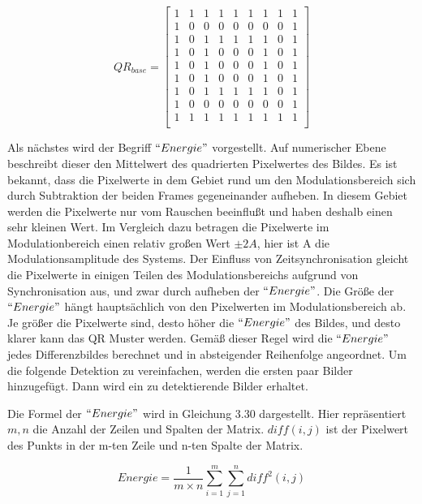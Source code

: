 \begin{equation}
QR_{base} = \begin{bmatrix}
    1 &1 &1 &1 &1 &1 &1 &1 &1 \\
    1 &0 &0 &0 &0 &0 &0 &0 &1 \\
    1 &0 &1 &1 &1 &1 &1 &0 &1 \\ 
    1 &0 &1 &0 &0 &0 &1 &0 &1 \\ 
    1 &0 &1 &0 &0 &0 &1 &0 &1 \\ 
    1 &0 &1 &0 &0 &0 &1 &0 &1 \\ 
    1 &0 &1 &1 &1 &1 &1 &0 &1 \\ 
    1 &0 &0 &0 &0 &0 &0 &0 &1 \\ 
    1 &1 &1 &1 &1 &1 &1 &1 &1 \\ 
\end{bmatrix}
\end{equation}

Als nächstes wird der Begriff $``Energie"$ vorgestellt. Auf numerischer Ebene beschreibt dieser den Mittelwert des quadrierten Pixelwertes des Bildes. Es ist bekannt, dass die Pixelwerte in dem Gebiet rund um den Modulationsbereich sich durch Subtraktion der beiden Frames gegeneinander aufheben. In diesem Gebiet werden die Pixelwerte nur vom Rauschen beeinflußt und haben deshalb einen sehr kleinen Wert. Im Vergleich dazu betragen die Pixelwerte im Modulationbereich einen relativ großen Wert $\pm2A$, hier ist A die Modulationsamplitude des Systems. Der Einfluss von Zeitsynchronisation gleicht die Pixelwerte in einigen Teilen des Modulationsbereichs aufgrund von Synchronisation aus, und zwar durch aufheben der $ ``Energie" $. Die Größe der $``Energie"$ hängt hauptsächlich von den Pixelwerten im Modulationsbereich ab. Je größer die Pixelwerte sind, desto höher die $``Energie"$ des Bildes, und desto klarer kann das QR Muster werden. Gemäß dieser Regel wird die $``Energie"$ jedes Differenzbildes berechnet und in absteigender Reihenfolge angeordnet. Um die folgende Detektion zu vereinfachen, werden die ersten paar Bilder hinzugefügt. Dann wird ein zu detektierende Bilder erhaltet. %

Die Formel der $``Energie"$ wird in Gleichung 3.30 dargestellt. Hier repräsentiert $ m,n $ die Anzahl der Zeilen und Spalten der Matrix. $diff(i,j)$ ist der Pixelwert des Punkts in der m-ten Zeile und n-ten Spalte der Matrix.

\begin{equation}
Energie = \frac{1}{m \times n} \sum_{i=1}^m \sum_{j=1}^n diff^2(i,j) 
\end{equation}

